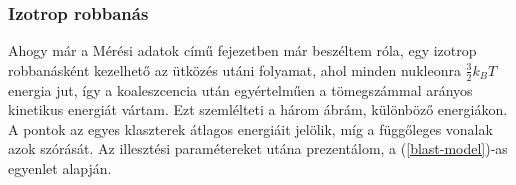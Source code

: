 \documentclass[a4paper,12pt]{article}
\begin{document}
\vspace{65mm}

\subsubsection{ Izotrop robbanás}

\vspace{5mm}

\par Ahogy már a Mérési adatok című fejezetben már beszéltem róla, egy izotrop robbanásként kezelhető az ütközés utáni folyamat, ahol minden nukleonra $\frac{3}{2}k_{B}T$ energia jut, így a koaleszcencia után egyértelműen a tömegszámmal arányos kinetikus energiát vártam. Ezt szemlélteti a három ábrám, különböző energiákon. A pontok az egyes klaszterek átlagos energiáit jelölik, míg a függőleges vonalak azok szórását. Az illesztési paramétereket utána prezentálom, a (\ref{blast-model})-as egyenlet alapján.

\vspace{5mm}
\end{document}
